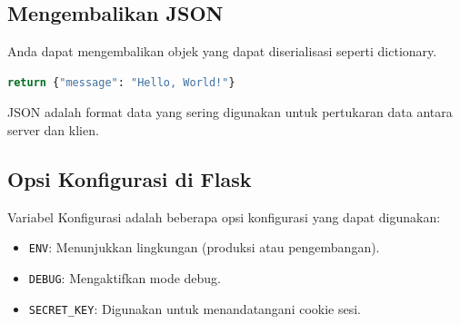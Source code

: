 \documentclass{article}
\begin{document}
\subsection{Mengembalikan JSON}
Anda dapat mengembalikan objek yang dapat diserialisasi seperti dictionary.
\begin{lstlisting}[language=Python, caption={}, captionpos=b]
    return {"message": "Hello, World!"}
\end{lstlisting}
JSON adalah format data yang sering digunakan untuk pertukaran data antara server dan klien.

\subsection{Opsi Konfigurasi di Flask}
Variabel Konfigurasi adalah beberapa opsi konfigurasi yang dapat digunakan:
\begin{itemize}
    \item \verb|ENV|: Menunjukkan lingkungan (produksi atau pengembangan).
    \item \verb|DEBUG|: Mengaktifkan mode debug.
    \item \verb|SECRET_KEY|: Digunakan untuk menandatangani cookie sesi.
\end{itemize}
\end{document}
